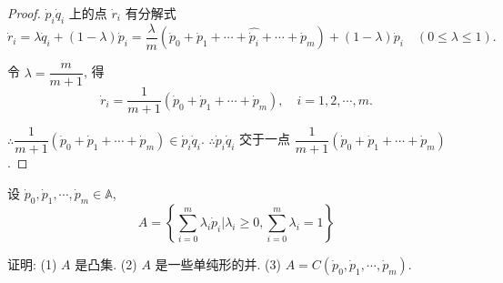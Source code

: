 \documentclass[color=black,device=normal,lang=cn,mode=geye]{elegantnote}
\begin{document}
\begin{proof}
    $\dot{p}_i\dot{q}_i$ 上的点 $\dot{r}_i$ 有分解式
    \[\dot{r}_i=\lambda\dot{q}_i+(1-\lambda)\dot{p}_i=\dfrac{\lambda}{m}(\dot{p}_0+\dot{p}_1+\cdots+\widehat{\dot{p}_i}+\cdots+\dot{p}_m)+(1-\lambda)\dot{p}_i\quad(0\leq\lambda\leq1).\]

    令 $\lambda=\dfrac{m}{m+1}$, 得
    \[\dot{r}_i=\dfrac{1}{m+1}(\dot{p}_0+\dot{p}_1+\cdots+\dot{p}_m),\quad i=1,2,\cdots,m.\]

    $\therefore\dfrac{1}{m+1}(\dot{p}_0+\dot{p}_1+\cdots+\dot{p}_m)\in\dot{p}_i\dot{q}_i$. $\therefore\dot{p}_i\dot{q}_i$ 交于一点 $\dfrac{1}{m+1}(\dot{p}_0+\dot{p}_1+\cdots+\dot{p}_m)$.
\end{proof}
\begin{exercisec}%
    设 $\dot{p}_0,\dot{p}_1,\cdots,\dot{p}_m\in\mathbb{A}$,
    \[A=\left\{\sum\limits_{i=0}^m\lambda_i\dot{p}_i\Bigg|\lambda_i\geq0,\sum\limits_{i=0}^m\lambda_i=1\right\}\]
    
    证明: (1) $A$ 是凸集. (2) $A$ 是一些单纯形的并. (3) $A=C(\dot{p}_0,\dot{p}_1,\cdots,\dot{p}_m)$.
\end{exercisec}
\end{document}
